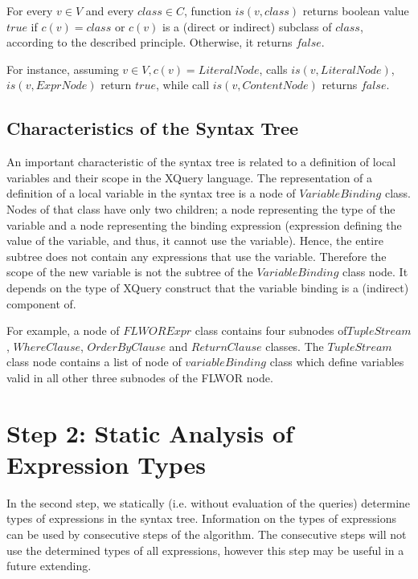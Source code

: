 \begin{define}For every $v \in V$ and every $class \in C$, function $is(v, class)$ returns boolean value $true$ if $c(v) = class$ or $c(v)$ is a (direct or indirect) subclass of $class$, according to the described principle. Otherwise, it returns $false$.
\end{define}

For instance, assuming $v \in V, c(v) = LiteralNode$, calls $is(v, LiteralNode)$, $is(v, ExprNode)$ return $true$, while call $is(v, ContentNode)$ returns $false$.

\subsection{Characteristics of the Syntax Tree}
An important characteristic of the syntax tree is related to a definition of local variables and their scope in the XQuery language. The representation of a definition of a local variable in the syntax tree is a node of $VariableBinding$ class. Nodes of that class have only two children; a node representing the type of the variable and a node representing the binding expression (expression defining the value of the variable, and thus, it cannot use the variable). Hence, the entire subtree does not contain any expressions that use the variable. Therefore the scope of the new variable is not the subtree of the $VariableBinding$ class node. It depends on the type of XQuery construct that the variable binding is a (indirect) component of.

For example, a node of $FLWORExpr$ class contains four subnodes of\linebreak $TupleStream$, $WhereClause$, $OrderByClause$ and $ReturnClause$ classes. The $TupleStream$ class node contains a list of node of $variableBinding$ class which define variables valid in all other three subnodes of the FLWOR node.



\section{Step 2: Static Analysis of Expression Types}
In the second step, we statically (i.e. without evaluation of the queries) determine types of expressions in the syntax tree. Information on the types of expressions can be used by consecutive steps of the algorithm. The consecutive steps will not use the determined types of all expressions, however this step may be useful in a future extending.


